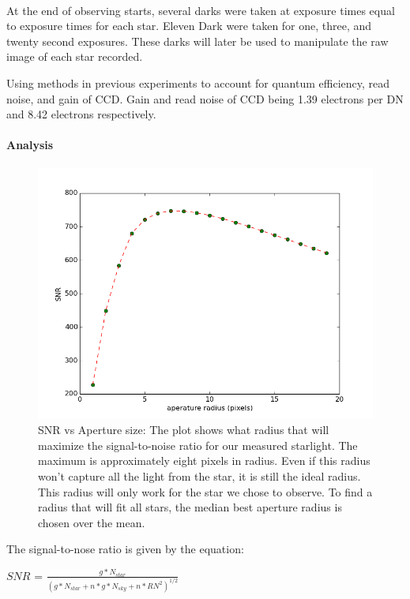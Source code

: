\documentclass[12 pt,twoside]{article}
\begin{document}
\ \

\indent
At the end of observing starts, several darks were taken at exposure times equal to exposure times for each star. Eleven Dark were taken for one, three, and twenty second exposures. These darks will later be used to manipulate the raw image of each star recorded.



Using methods in previous experiments to account for quantum efficiency, read noise, and gain of CCD. Gain and read noise of CCD being 1.39 electrons per DN and 8.42 electrons respectively.

\paragraph{Analysis}

\begin{center}
\begin{figure}[!hb]
\includegraphics[scale=0.5]{figure_1.png}
\caption{\small SNR vs Aperture size: The plot shows what radius that will maximize the signal-to-noise ratio for our measured starlight. The maximum is approximately eight pixels in radius. Even if this radius won't capture all the light from the star, it is still the ideal radius. This radius will only work for the star we chose to observe. To find a radius that will fit all stars, the median best aperture radius is chosen over the mean.}
\end{figure}
\end{center}

The signal-to-nose ratio is given by the equation: 
\begin{center}
$SNR$ = $ \frac{g * N_{star}}{(g  *  N_{star} + n * g * N_{sky} + n * RN^2)^{1/2}}$
\end{center}
\end{document}
